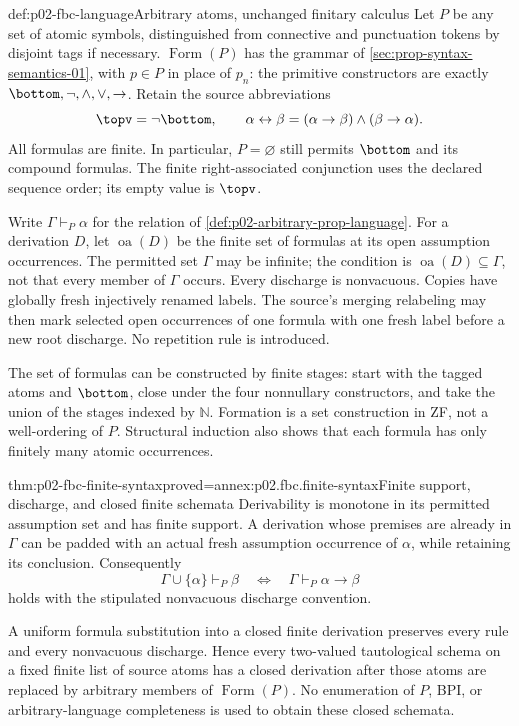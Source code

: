 \begin{hbconvention}{def:p02-fbc-language}{Arbitrary atoms, unchanged finitary calculus}
Let \(P\) be any set of atomic symbols, distinguished from connective and
punctuation tokens by disjoint tags if necessary.
\(\operatorname{Form}(P)\) has the grammar of
\cref{sec:prop-syntax-semantics-01}, with \(p\in P\) in place of \(p_n\):
the primitive constructors are exactly
\(\bottom,\neg,\land,\lor,\to\).
Retain the source abbreviations
\[
 \topv=\neg\bottom,\qquad
 \alpha\leftrightarrow\beta
       =(\alpha\to\beta)\land(\beta\to\alpha).
\]
All formulas are finite. In particular, \(P=\varnothing\) still permits
\(\bottom\) and its compound formulas.
The finite right-associated conjunction uses the declared sequence order;
its empty value is \(\topv\).

Write \(\Gamma\vdash_P\alpha\) for the relation of
\cref{def:p02-arbitrary-prop-language}.
For a derivation \(D\), let \(\operatorname{oa}(D)\) be the finite set
of formulas at its open assumption occurrences. The permitted set
\(\Gamma\) may be infinite; the condition is
\(\operatorname{oa}(D)\subseteq\Gamma\), not that every member of
\(\Gamma\) occurs.
Every discharge is nonvacuous. Copies have globally fresh injectively
renamed labels. The source's merging relabeling may then mark selected
open occurrences of one formula with one fresh label before a new
root discharge. No repetition rule is introduced.
\end{hbconvention}

The set of formulas can be constructed by finite stages: start with
the tagged atoms and \(\bottom\), close under the four nonnullary
constructors, and take the union of the stages indexed by
\(\mathbb N\). Formation is a set construction in ZF, not a
well-ordering of \(P\). Structural induction also shows that each
formula has only finitely many atomic occurrences.

\begin{hblemma}{thm:p02-fbc-finite-syntax}{proved=annex:p02.fbc.finite-syntax}{Finite support, discharge, and closed finite schemata}
Derivability is monotone in its permitted assumption set and has finite
support. A derivation whose premises are already in \(\Gamma\) can be
padded with an actual fresh assumption occurrence of \(\alpha\), while
retaining its conclusion. Consequently
\[
 \Gamma\cup\{\alpha\}\vdash_P\beta
       \quad\Longleftrightarrow\quad
 \Gamma\vdash_P\alpha\to\beta
\]
holds with the stipulated nonvacuous discharge convention.

A uniform formula substitution into a closed finite derivation preserves
every rule and every nonvacuous discharge. Hence every two-valued
tautological schema on a fixed finite list of source atoms has a
closed derivation after those atoms are replaced by arbitrary members
of \(\operatorname{Form}(P)\).
No enumeration of \(P\), BPI, or arbitrary-language completeness is
used to obtain these closed schemata.
\end{hblemma}

